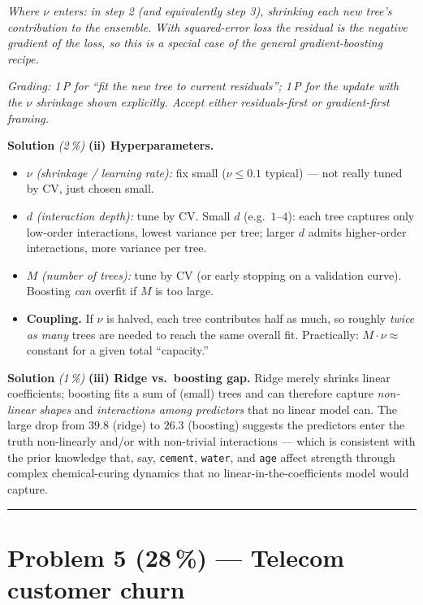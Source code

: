 \documentclass[11pt,a4paper]{article}
\newcommand{\points}[1]{\textbf{(#1\,\%)}}
\newcommand{\subpoints}[1]{\textit{(#1\,\%)}}
\newcommand{\sol}{\noindent\textbf{Solution}}
\begin{document}
\emph{Where $\nu$ enters: in step 2 (and equivalently step 3), shrinking each new tree's
contribution to the ensemble. With squared-error loss the residual is the negative gradient of
the loss, so this is a special case of the general gradient-boosting recipe.}

\noindent\emph{Grading: 1\,P for ``fit the new tree to current residuals''; 1\,P for the update
with the $\nu$ shrinkage shown explicitly. Accept either residuals-first or gradient-first framing.}

\medskip
\sol{} \subpoints{2} \textbf{(ii) Hyperparameters.}
\begin{itemize}
  \item $\nu$ \emph{(shrinkage / learning rate):} fix small ($\nu \le 0.1$ typical) --- not really
        tuned by CV, just chosen small.
  \item $d$ \emph{(interaction depth):} tune by CV. Small $d$ (e.g.\ $1$--$4$): each tree captures
        only low-order interactions, lowest variance per tree; larger $d$ admits higher-order
        interactions, more variance per tree.
  \item $M$ \emph{(number of trees):} tune by CV (or early stopping on a validation curve).
        Boosting \emph{can} overfit if $M$ is too large.
  \item \textbf{Coupling.} If $\nu$ is halved, each tree contributes half as much, so roughly
        \emph{twice as many} trees are needed to reach the same overall fit. Practically: $M\cdot\nu
        \approx$ constant for a given total ``capacity.''
\end{itemize}

\medskip
\sol{} \subpoints{1} \textbf{(iii) Ridge vs.\ boosting gap.} Ridge merely shrinks linear
coefficients; boosting fits a sum of (small) trees and can therefore capture \emph{non-linear
shapes} and \emph{interactions among predictors} that no linear model can. The large drop from
$39.8$ (ridge) to $26.3$ (boosting) suggests the predictors enter the truth non-linearly and/or
with non-trivial interactions --- which is consistent with the prior knowledge that, say,
\texttt{cement}, \texttt{water}, and \texttt{age} affect strength through complex chemical-curing
dynamics that no linear-in-the-coefficients model would capture.

\vspace{0.6em}
\hrule
\vspace{1em}

\section*{Problem 5 \points{28} --- Telecom customer churn}
\end{document}
